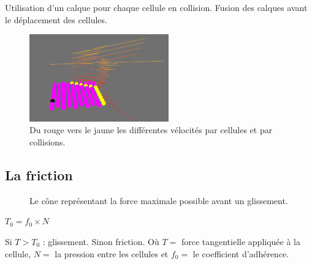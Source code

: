 \documentclass{beamer}
\begin{document}
\begin{frame}
  Utilisation d'un calque pour chaque cellule en collision. Fusion des calques avant le déplacement des cellules.
  \begin{figure}
    \begin{center}
      \includegraphics[width=6cm]{Images/calque.png}
    \end{center}
    \caption{Du rouge vers le jaune les différentes vélocités par cellules et par collisions.}
  \end{figure}
\end{frame}

\subsection{La friction}
\begin{frame}
  \begin{figure}
    \begin{center}
    \end{center}
    \caption{Le cône représentant la force maximale possible avant un glissement.}
  \end{figure}
  \begin{center}
    $T_0 = f_0 \times N$
  \end{center}
  Si $T > T_0$ : glissement. Sinon friction. \smallbreak
  Où $T = $ force tangentielle appliquée à la cellule, $N = $ la pression entre les cellules et $f_0 = $ le coefficient d'adhérence.
\end{frame}
\end{document}
